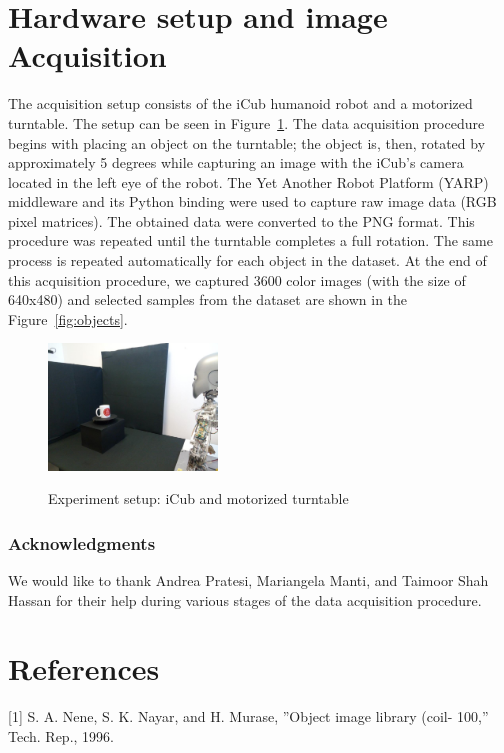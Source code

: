\documentclass{article}
\begin{document}
\section{Hardware setup and image Acquisition}
The acquisition setup consists of the iCub humanoid robot and a motorized turntable. The setup can be seen in Figure~\ref{fig:expsetup}.  The data acquisition procedure begins with placing an object on the turntable; the object is, then, rotated by approximately 5 degrees while capturing an image with the iCub's camera located in the left eye of the robot. 
The Yet Another Robot Platform (YARP) middleware and its Python binding were used to capture raw image data  (RGB pixel matrices). The obtained data were converted to the PNG format.  This procedure was repeated until the turntable completes a full rotation.  The same process is repeated automatically for each object in the dataset. At the end of this acquisition procedure, we captured 3600 color images (with the size of 640x480) and selected samples from the dataset are shown in the Figure~\ref{fig:objects}.
\begin{figure}[h]
	\centering
	\begin{center}
		\label{fig:a}\includegraphics[width=0.4\textwidth]{figs/icub4}
	\end{center}
	\caption{Experiment setup: iCub and motorized turntable}
	\label{fig:expsetup}
\end{figure} 
 
\subsubsection*{Acknowledgments}
We would like to thank Andrea Pratesi, Mariangela Manti, and Taimoor Shah Hassan for their help during various stages of the data acquisition procedure.

\section*{References}


\small

[1] S. A. Nene, S. K. Nayar, and H. Murase, ''Object image library (coil- 100,” Tech. Rep., 1996.
\end{document}
